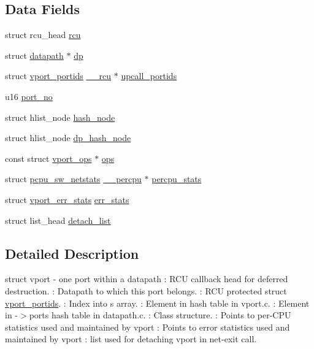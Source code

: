 \subsection*{Data Fields}
\begin{DoxyCompactItemize}
\item 
struct rcu\+\_\+head \hyperlink{structvport_ac08b8a62e054bc2840a9ba6964091f89}{rcu}
\item 
struct \hyperlink{structdatapath}{datapath} $\ast$ \hyperlink{structvport_a49fb6f6bf0ac4337853e9242e88ddc42}{dp}
\item 
struct \hyperlink{structvport__portids}{vport\+\_\+portids} \hyperlink{compiler_8h_a2b3b0c016258969e4b39c66b6eec2129}{\+\_\+\+\_\+rcu} $\ast$ \hyperlink{structvport_a7963679d5c8d3a923eb42faf9d5fb2d1}{upcall\+\_\+portids}
\item 
u16 \hyperlink{structvport_aae00fc5d12b47f02cbfd4f67ae114b58}{port\+\_\+no}
\item 
struct hlist\+\_\+node \hyperlink{structvport_ae6324a0c2483c3d1600cb29a6f4bcb8d}{hash\+\_\+node}
\item 
struct hlist\+\_\+node \hyperlink{structvport_a27d2c94e2edd5de172e0b866cdd70fea}{dp\+\_\+hash\+\_\+node}
\item 
const struct \hyperlink{structvport__ops}{vport\+\_\+ops} $\ast$ \hyperlink{structvport_a5af933fc664c1194ac3bbc337da35586}{ops}
\item 
struct \hyperlink{structpcpu__sw__netstats}{pcpu\+\_\+sw\+\_\+netstats} \hyperlink{compiler_8h_a497f20279760cdb59a5187689f9f5ab1}{\+\_\+\+\_\+percpu} $\ast$ \hyperlink{structvport_a04983f0d17ae4deb6ffb87333f6d4f05}{percpu\+\_\+stats}
\item 
struct \hyperlink{structvport__err__stats}{vport\+\_\+err\+\_\+stats} \hyperlink{structvport_a5cd8a50cb02833a868db549d64052c99}{err\+\_\+stats}
\item 
struct list\+\_\+head \hyperlink{structvport_ae41f659d10b0f1c27324e9406d5c2ef1}{detach\+\_\+list}
\end{DoxyCompactItemize}


\subsection{Detailed Description}
struct vport -\/ one port within a datapath \+: R\+C\+U callback head for deferred destruction. \+: Datapath to which this port belongs. \+: R\+C\+U protected \textquotesingle{}struct \hyperlink{structvport__portids}{vport\+\_\+portids}\textquotesingle{}. \+: Index into \textquotesingle{}s  array. \+: Element in  hash table in vport.\+c. \+: Element in -\/$>$ports hash table in datapath.\+c. \+: Class structure. \+: Points to per-\/\+C\+P\+U statistics used and maintained by vport \+: Points to error statistics used and maintained by vport \+: list used for detaching vport in net-\/exit call. 

